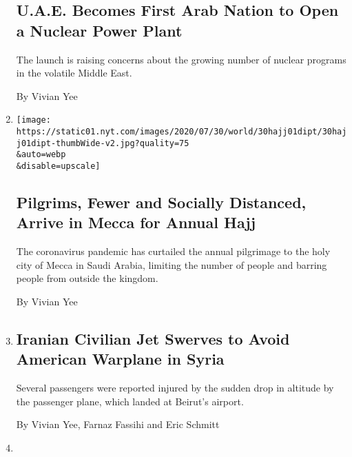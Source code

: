 \begin{enumerate}
  \hypertarget{uae-becomes-first-arab-nation-to-open-a-nuclear-power-plant}{%
  \subsection{U.A.E. Becomes First Arab Nation to Open a Nuclear Power
  Plant}\label{uae-becomes-first-arab-nation-to-open-a-nuclear-power-plant}}

  The launch is raising concerns about the growing number of nuclear
  programs in the volatile Middle East.

  By Vivian Yee
\item
  \href{/2020/07/30/world/middleeast/pilgrims-hajj-mecca-coronavirus-pandemic.html}{}

  \texttt{[image: https://static01.nyt.com/images/2020/07/30/world/30hajj01dipt/30hajj01dipt-thumbWide-v2.jpg?quality=75\\\&auto=webp\\\&disable=upscale]}

  \hypertarget{pilgrims-fewer-and-socially-distanced-arrive-in-mecca-for-annual-hajj}{%
  \subsection{Pilgrims, Fewer and Socially Distanced, Arrive in Mecca
  for Annual
  Hajj}\label{pilgrims-fewer-and-socially-distanced-arrive-in-mecca-for-annual-hajj}}

  The coronavirus pandemic has curtailed the annual pilgrimage to the
  holy city of Mecca in Saudi Arabia, limiting the number of people and
  barring people from outside the kingdom.

  By Vivian Yee
\item
  \href{/2020/07/23/world/middleeast/iran-warplanes-syria.html}{}

  \hypertarget{iranian-civilian-jet-swerves-to-avoid-american-warplane-in-syria}{%
  \subsection{Iranian Civilian Jet Swerves to Avoid American Warplane in
  Syria}\label{iranian-civilian-jet-swerves-to-avoid-american-warplane-in-syria}}

  Several passengers were reported injured by the sudden drop in
  altitude by the passenger plane, which landed at Beirut's airport.

  By Vivian Yee, Farnaz Fassihi and Eric Schmitt
\item
  \href{/2020/07/23/world/middleeast/saudi-arabia-king-salman-surgery.html}{}


\end{enumerate}

